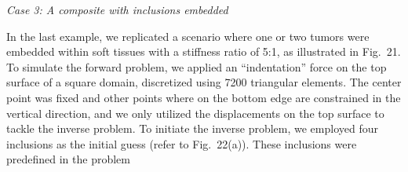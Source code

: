 \documentclass[11pt]{article}
\begin{document}
\noindent\textit{Case 3: A composite with inclusions embedded}

\vspace{0.5em}

\noindent
In the last example, we replicated a scenario where one or two
tumors were embedded within soft tissues with a stiffness ratio
of 5:1, as illustrated in Fig.~21. To simulate the forward problem,
we applied an ``indentation'' force on the top surface of a square
domain, discretized using 7200 triangular elements. The center
point was fixed and other points where on the bottom edge are
constrained in the vertical direction, and we only utilized the
displacements on the top surface to tackle the inverse problem.
To initiate the inverse problem, we employed four inclusions as
the initial guess (refer to Fig.~22(a)). These inclusions were
predefined in the problem


\newpage

\end{document}
